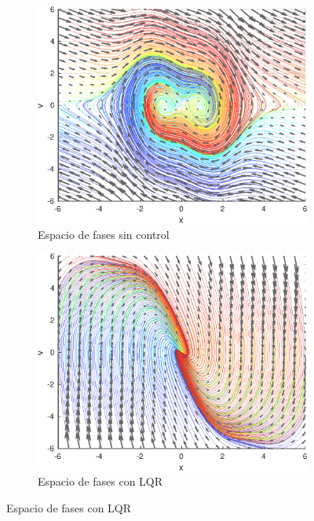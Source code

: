 \begin{example}
    \begin{figure}
        \centering
        \begin{subfigure}[b]{0.4\textwidth}
            \includegraphics[width=\textwidth]{img/freepot.eps}
            \caption{Espacio de fases sin control}
            \label{afree}
        \end{subfigure}
        \begin{subfigure}[b]{0.4\textwidth}
            \includegraphics[width=\textwidth]{img/lqrpot.eps}
            \caption{Espacio de fases con LQR}
            \label{bLQR}
        \end{subfigure}

\end{figure}
\end{example}
